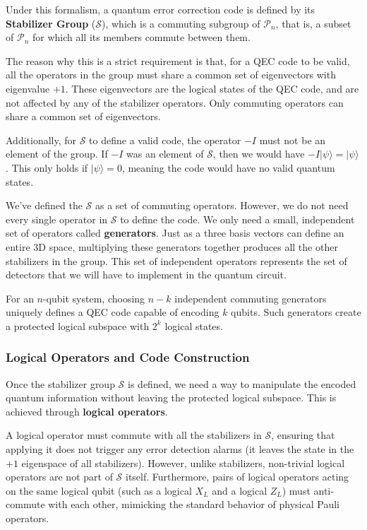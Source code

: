 Under this formalism, a quantum error correction code is defined by its \textbf{Stabilizer Group} ($\mathcal{S}$), which is a commuting subgroup of $\mathcal{P}_n$, that is, a subset of $\mathcal{P}_n$ for which all its members commute between them. 

The reason why this is a strict requirement is that, for a QEC code to be valid, all the operators in the group must share a common set of eigenvectors with eigenvalue $+1$. These eigenvectors are the logical states of the QEC code, and are not affected by any of the stabilizer operators. Only commuting operators can share a common set of eigenvectors.

Additionally, for $\mathcal{S}$ to define a valid code, the operator $-I$ must not be an element of the group. If $-I$ was an element of $\mathcal{S}$, then we would have $-I \lvert \psi \rangle = \lvert \psi \rangle$. This only holds if $\lvert \psi \rangle = 0$, meaning the code would have no valid quantum states.

We've defined the $\mathcal{S}$ as a set of commuting operators. However, we do not need every single operator in $\mathcal{S}$ to define the code. We only need a small, independent set of operators called \textbf{generators}. Just as a three basis vectors can define an entire 3D space, multiplying these generators together produces all the other stabilizers in the group. This set of independent operators represents the set of detectors that we will have to implement in the quantum circuit.

For an $n$-qubit system, choosing $n-k$ independent commuting generators uniquely defines a QEC code capable of encoding $k$ qubits. Such generators create a protected logical subspace with $2^k$ logical states.

\subsubsection{Logical Operators and Code Construction}

Once the stabilizer group $\mathcal{S}$ is defined, we need a way to manipulate the encoded quantum information without leaving the protected logical subspace. This is achieved through \textbf{logical operators}. 

A logical operator must commute with all the stabilizers in $\mathcal{S}$, ensuring that applying it does not trigger any error detection alarms (it leaves the state in the $+1$ eigenspace of all stabilizers). However, unlike stabilizers, non-trivial logical operators are not part of $\mathcal{S}$ itself. Furthermore, pairs of logical operators acting on the same logical qubit (such as a logical $X_L$ and a logical $Z_L$) must anti-commute with each other, mimicking the standard behavior of physical Pauli operators.

